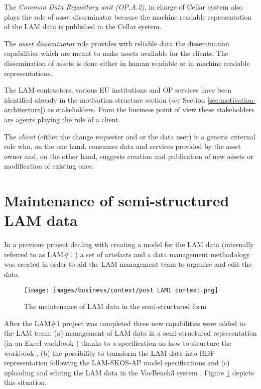 	The \textit{Common Data Repository unit (OP.A.2)}, in charge of Cellar system \citep{cdm-francesconi2015ontology} also plays the role of asset disseminator because the machine readable representation of the LAM data is published in the Cellar system.
	
	The \textit{asset disseminator} role provides with reliable data the dissemination capabilities which are meant to make assets available for the clients. The dissemination of assets is done either in human readable or in machine readable representations.
	
	The LAM contractors, various EU institutions and OP services have been identified already in the motivation structure section (see Section \ref{sec:motivation-architecture}) as stakeholders. From the business point of view these stakeholders are agents playing the role of a client.
	
	The \textit{client} (either the change requester and or the data user) is a generic external role who, on the one hand, consumes data and services provided by the asset owner and, on the other hand, suggests creation and publication of new assets or modification of existing ones.
	
	\section{Maintenance of semi-structured LAM data}
	\label{sec:maintenance-of-excel}
	In a previous project dealing with creating a model for the LAM data (internally referred to as LAM\#1 \citep{lam-preliminary-requirements-2019}) a set of artefacts and a data management methodology was created in order to aid the LAM management team to organise and edit the data. 
	
	\begin{figure}[h]
		\centering
		\texttt{[image: images/business/context/post LAM1 context.png]}
		\caption{The maintenance of LAM data in the semi-structured form}
		\label{fig:post-lam1-context}
	\end{figure} 
	
	After the LAM\#1 project \citep{lam-preliminary-requirements-2019} was completed three new capabilities were added to the LAM team: (a) management of LAM data in a semi-structured representation (in an Excel workbook \cite{excel}) thanks to a specification on how to structure the workbook \citep{lam-excel-structure-2019}, (b) the possibility to transform the LAM data into RDF representation following the LAM-SKOS-AP \citep{lam-skos-ap-2019} model specifications  and (c) uploading and editing the LAM data in the VocBench3 system \citep{stellato2017towards,stellatovocbench}. Figure \ref{fig:post-lam1-context} depicts this situation. 
	
